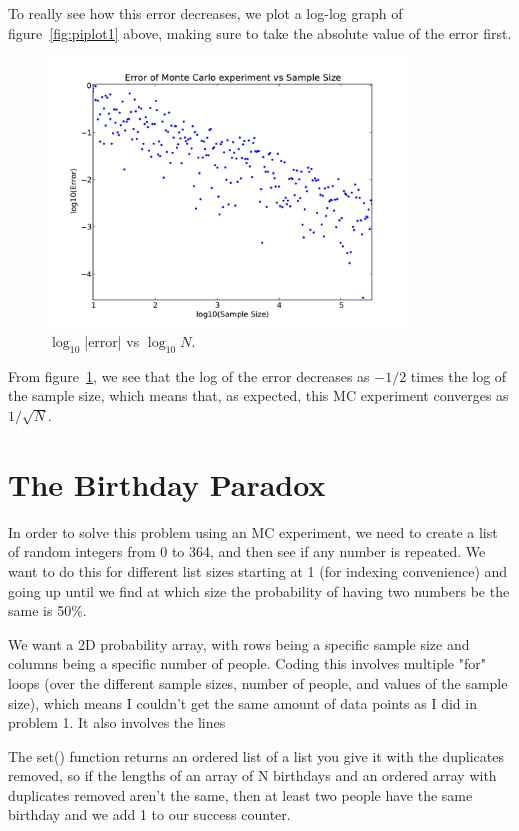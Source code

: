 \documentclass[11pt,letterpaper]{article}
\begin{document}
To really see how this error decreases, we plot a log-log graph of 
figure~\ref{fig:piplot1} above, making sure to take the absolute value of 
the error first.

\begin{figure}
\centering
\includegraphics[width=0.85\textwidth]{pi_logerr_plot.pdf}
\caption{$\log_{10}$|error| vs $\log_{10} N$.}
\label{fig:piplot2}
\end{figure}  

From figure~\ref{fig:piplot2}, we see that the log of the error decreases 
as $-1/2$ times the log of the sample size, which means that, as
expected, this MC experiment converges as $1/\sqrt{N}$.

\section{The Birthday Paradox}

In order to solve this problem using an MC experiment, we need to create a 
list of random integers from 0 to 364, and then see if any number is repeated. 
We want to do this for different list sizes starting at 1 (for indexing 
convenience) and going up until we find at which size the probability of
having two numbers be the same is 50\%. 

We want a 2D probability array, with rows being a specific sample size 
and columns being a specific number of people. Coding this involves 
multiple "for" loops (over the different sample sizes, 
number of people, and values of the sample size), which means I couldn't 
get the same amount of data points as I did in problem 1. It also involves
the lines

The set() function returns an ordered list of a list you give it with the 
duplicates removed, so if the lengths of an array of N birthdays and an 
ordered array with duplicates removed aren't the same, then at least two 
people have the same birthday and we add 1 to our success counter.
\end{document}
